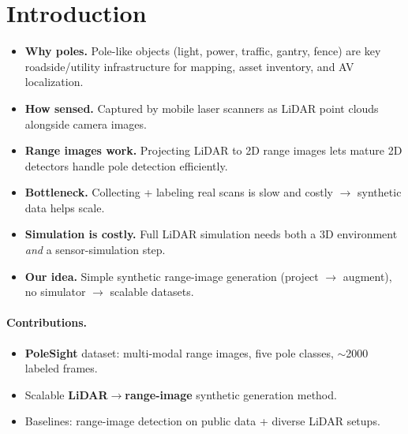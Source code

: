 \section{Introduction}
\label{sec:intro}
\begin{itemize}
    \item \textbf{Why poles.} Pole-like objects (light, power, traffic, gantry,
        fence) are key roadside/utility infrastructure for mapping, asset
        inventory, and AV localization.
    \item \textbf{How sensed.} Captured by mobile laser scanners as LiDAR point
        clouds alongside camera images.
    \item \textbf{Range images work.} Projecting LiDAR to 2D range images lets
        mature 2D detectors handle pole detection efficiently.
    \item \textbf{Bottleneck.} Collecting + labeling real scans is slow and
        costly $\rightarrow$ synthetic data helps scale.
    \item \textbf{Simulation is costly.} Full LiDAR simulation needs both a 3D
        environment \emph{and} a sensor-simulation step.
    \item \textbf{Our idea.} Simple synthetic range-image generation
        (project $\rightarrow$ augment), no simulator $\rightarrow$ scalable datasets.
\end{itemize}

\paragraph{Contributions.}
\begin{itemize}
    \item \textbf{PoleSight} dataset: multi-modal range images, five pole
        classes, $\sim$2000 labeled frames.
    \item Scalable \textbf{LiDAR$\rightarrow$range-image} synthetic generation method.
    \item Baselines: range-image detection on public data + diverse LiDAR setups.
\end{itemize}

